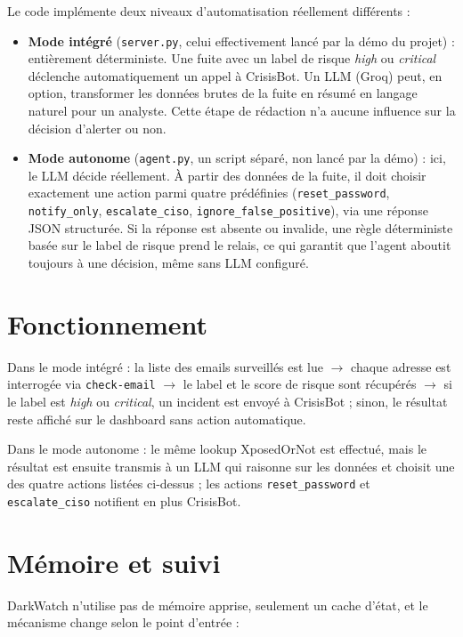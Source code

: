 \documentclass[12pt,a4paper]{report}
\begin{document}
Le code implémente deux niveaux d'automatisation réellement différents :

\begin{itemize}[nosep]
\item \textbf{Mode intégré} (\texttt{server.py}, celui effectivement lancé par la démo du projet) : entièrement déterministe. Une fuite avec un label de risque \emph{high} ou \emph{critical} déclenche automatiquement un appel à CrisisBot. Un LLM (Groq) peut, en option, transformer les données brutes de la fuite en résumé en langage naturel pour un analyste. Cette étape de rédaction n'a aucune influence sur la décision d'alerter ou non.
\item \textbf{Mode autonome} (\texttt{agent.py}, un script séparé, non lancé par la démo) : ici, le LLM décide réellement. À partir des données de la fuite, il doit choisir exactement une action parmi quatre prédéfinies (\texttt{reset\_password}, \texttt{notify\_only}, \texttt{escalate\_ciso}, \texttt{ignore\_false\_positive}), via une réponse JSON structurée. Si la réponse est absente ou invalide, une règle déterministe basée sur le label de risque prend le relais, ce qui garantit que l'agent aboutit toujours à une décision, même sans LLM configuré.
\end{itemize}

\section{Fonctionnement}

Dans le mode intégré : la liste des emails surveillés est lue $\rightarrow$ chaque adresse est interrogée via \texttt{check-email} $\rightarrow$ le label et le score de risque sont récupérés $\rightarrow$ si le label est \emph{high} ou \emph{critical}, un incident est envoyé à CrisisBot ; sinon, le résultat reste affiché sur le dashboard sans action automatique.

Dans le mode autonome : le même lookup XposedOrNot est effectué, mais le résultat est ensuite transmis à un LLM qui raisonne sur les données et choisit une des quatre actions listées ci-dessus ; les actions \texttt{reset\_password} et \texttt{escalate\_ciso} notifient en plus CrisisBot.

\section{Mémoire et suivi}

DarkWatch n'utilise pas de mémoire apprise, seulement un cache d'état, et le mécanisme change selon le point d'entrée :
\end{document}
